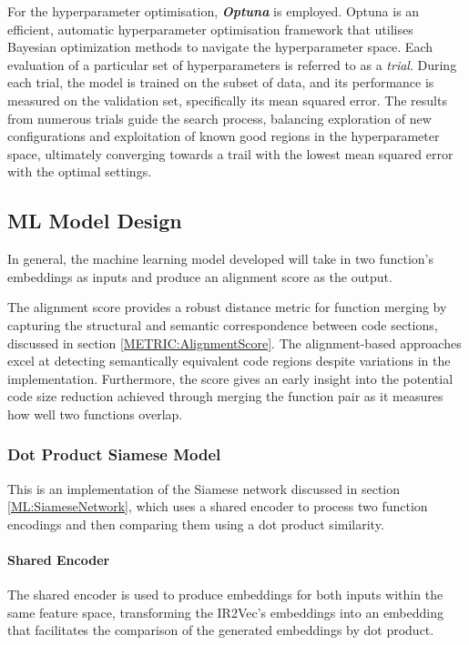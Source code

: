 For the hyperparameter optimisation, \textbf{\textit{Optuna}} is employed. Optuna is an efficient, automatic hyperparameter optimisation framework that utilises Bayesian optimization methods to navigate the hyperparameter space. Each evaluation of a particular set of hyperparameters is referred to as a \emph{trial}. During each trial, the model is trained on the subset of data, and its performance is measured on the validation set, specifically its mean squared error. The results from numerous trials guide the search process, balancing exploration of new configurations and exploitation of known good regions in the hyperparameter space, ultimately converging towards a trail with the lowest mean squared error with the optimal settings.

\subsection{ML Model Design}
In general, the machine learning model developed will take in two function's embeddings as inputs and produce an alignment score as the output.

The alignment score provides a robust distance metric for function merging by capturing the structural and semantic correspondence between code sections, discussed in section \ref{METRIC:AlignmentScore}. The alignment-based approaches excel at detecting semantically equivalent code regions despite variations in the implementation. Furthermore, the score gives an early insight into the potential code size reduction achieved through merging the function pair as it measures how well two functions overlap. 

\subsubsection{Dot Product Siamese Model}
This is an implementation of the Siamese network discussed in section \ref{ML:SiameseNetwork}, which uses a shared encoder to process two function encodings and then comparing them using a dot product similarity.

\paragraph{Shared Encoder} The shared encoder is used to produce embeddings for both inputs within the same feature space, transforming the IR2Vec's embeddings into an embedding that facilitates the comparison of the generated embeddings by dot product.

